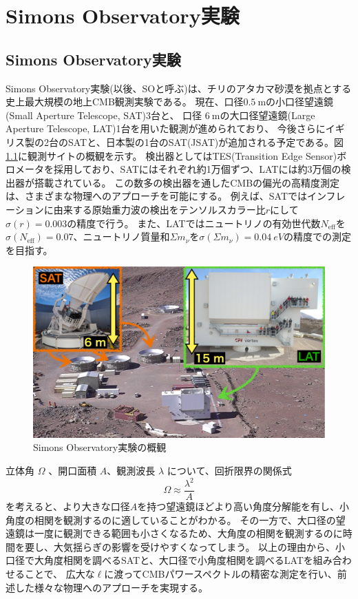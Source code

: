\documentclass[../../main.tex]{subfiles}
\begin{document}
\chapter{Simons Observatory実験}
\section{Simons Observatory実験}
Simons Observatory実験(以後、SOと呼ぶ)は、チリのアタカマ砂漠を拠点とする史上最大規模の地上CMB観測実験である。
現在、口径$0.5\ \mathrm{m}$の小口径望遠鏡(Small Aperture Telescope, SAT)3台と、
口径 $6\ \mathrm{m}$の大口径望遠鏡(Large Aperture Telescope, LAT)1台を用いた観測が進められており\cite{so:current_status}、
今後さらにイギリス製の2台のSATと、日本製の1台のSAT(JSAT)が追加される予定である。図\ref{fig:so_site}に観測サイトの概観を示す。
検出器としてはTES(Transition Edge Sensor)ボロメータを採用しており、SATにはそれぞれ約1万個ずつ、LATには約3万個の検出器が搭載されている。
この数多の検出器を通したCMBの偏光の高精度測定は、さまざまな物理へのアプローチを可能にする。
例えば、SATではインフレーションに由来する原始重力波の検出をテンソルスカラー比$r$にして$\sigma(r)=0.003$の精度で行う。
また、LATではニュートリノの有効世代数$N_\mathrm{eff}$を$\sigma(N_{\mathrm{eff}})=0.07$、ニュートリノ質量和$\Sigma m_\nu$を$\sigma(\Sigma m_\nu)=\SI{0.04}{eV}$の精度での測定を目指す\cite{so:science_forecast}。
\begin{figure}[H]
    \centering
    \includegraphics[width=1.0\textwidth]{simons_observatory/so_site.pdf}
    \caption{Simons Observatory実験の概観}
    \label{fig:so_site}
\end{figure}

立体角 $\Omega$ 、開口面積 $A$、観測波長 $\lambda$ について、回折限界の関係式
\begin{equation}
    \Omega \approx \dfrac{\lambda^2}{A}
\end{equation}
を考えると、より大きな口径$A$を持つ望遠鏡ほどより高い角度分解能を有し、小角度の相関を観測するのに適していることがわかる。
その一方で、大口径の望遠鏡は一度に観測できる範囲も小さくなるため、大角度の相関を観測するのに時間を要し、大気揺らぎの影響を受けやすくなってしまう。
以上の理由から、小口径で大角度相関を調べるSATと、大口径で小角度相関を調べるLATを組み合わせることで、
広大な$\ell$に渡ってCMBパワースペクトルの精密な測定を行い、前述した様々な物理へのアプローチを実現する。
\end{document}
